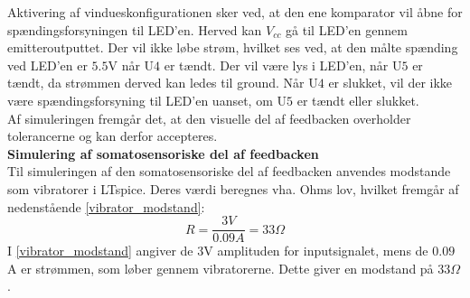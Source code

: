 \noindent Aktivering af vindueskonfigurationen sker ved, at den ene komparator vil åbne for spændingsforsyningen til LED'en. Herved kan $V_{cc}$ gå til LED'en gennem emitteroutputtet. Der vil ikke løbe strøm, hvilket ses ved, at den målte spænding ved LED'en er $5.5$V når U$4$ er tændt. Der vil være lys i LED'en, når U$5$ er tændt, da strømmen derved kan ledes til ground. Når U$4$ er slukket, vil der ikke være spændingsforsyning til LED'en uanset, om U$5$ er tændt eller slukket. \\
Af simuleringen fremgår det, at den visuelle del af feedbacken overholder tolerancerne og kan derfor accepteres.\\ 

\noindent\textbf{Simulering af somatosensoriske del af feedbacken} \\
Til simuleringen af den somatosensoriske del af feedbacken anvendes modstande som vibratorer i LTspice. Deres værdi beregnes vha. Ohms lov, hvilket fremgår af nedenstående \eqref{vibrator_modstand}:
\begin{equation} \label{vibrator_modstand}
R = \dfrac{3V}{0.09A} = 33\Omega
\end{equation}
\noindent I \eqref{vibrator_modstand} angiver de $3$V amplituden for inputsignalet, mens de $0.09$A er strømmen, som løber gennem vibratorerne. Dette giver en modstand på $33\Omega$. \\

